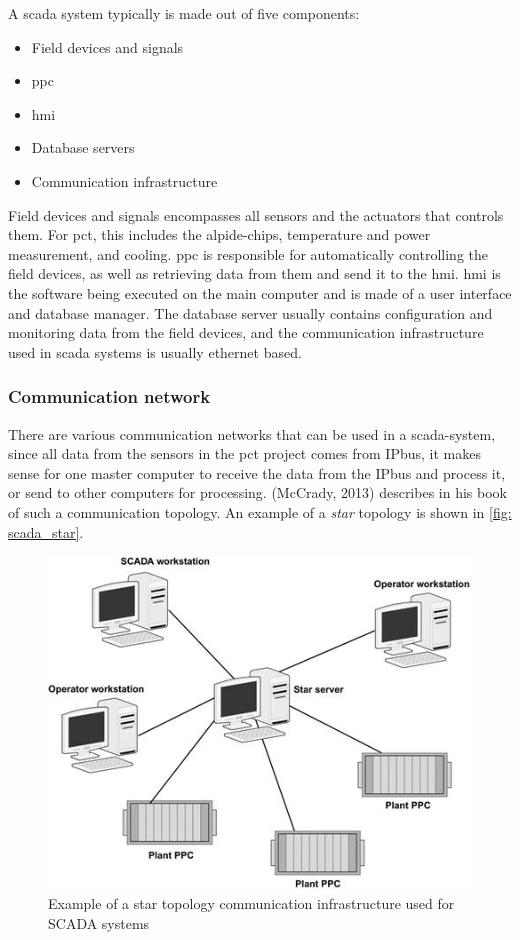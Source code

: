 \documentclass[main.tex]{subfiles}
\begin{document}
A \gls{scada} system typically is made out of five components:

\begin{itemize}
    \item Field devices and signals
    \item \acrfull{ppc}
    \item \acrfull{hmi}
    \item Database servers
    \item Communication infrastructure
\end{itemize}

Field devices and signals encompasses all sensors and the actuators that controls them. For \gls{pct}, this includes the \gls{alpide}-chips, temperature and power measurement, and cooling. \gls{ppc} is responsible for automatically controlling the field devices, as well as retrieving data from them and send it to the \gls{hmi}. \gls{hmi} is the software being executed on the main computer and is made of a user interface and database manager. The database server usually contains configuration and monitoring data from the field devices, and the communication infrastructure used in \gls{scada} systems is usually ethernet based.

\subsubsection{Communication network}
There are various communication networks that can be used in a \gls{scada}-system, since all data from the sensors in the \gls{pct} project comes from IPbus, it makes sense for one master computer to receive the data from the IPbus and process it, or send to other computers for processing. (McCrady, 2013) describes in his book of such a communication topology\cite{scada_design}. An example of a \textit{star} topology is shown in \autoref{fig: scada_star}.

\begin{figure}[!ht]
    \centering
    \includegraphics[scale=0.6]{images/scada_topology.png}
    \caption{Example of a star topology communication infrastructure used for SCADA systems\cite{scada_design}}
    \label{fig: scada_star}
\end{figure}
\FloatBarrier
\end{document}
